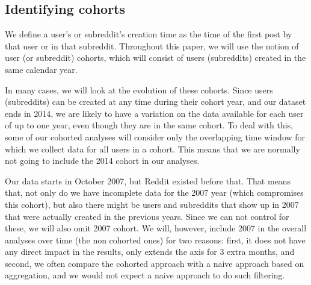 \subsection{Identifying cohorts}

We define a user's or subreddit's creation time as the time of the first post by that user or in that subreddit.  Throughout this paper, we will use the notion of user (or subreddit) cohorts, which will consist of users (subreddits) created in the same calendar year.

In many cases, we will look at the evolution of these cohorts. Since users (subreddits) can be created at any time during their cohort year, and our dataset ends in 2014, 
we are likely to have a variation on the data available for each user of up to one year, even though they are in the same cohort.  To deal with this, some of our cohorted analyses will consider only the overlapping time window for which we collect data for all users in a cohort.   This means that we are normally not going to include the 2014 cohort in our analyses.

Our data starts in October 2007, but Reddit existed before that. That means that, not only do we have incomplete data for the 2007 year (which compromises this cohort), but also there might be users and subreddits that show up in 2007 that were actually created in the previous years. Since we can not control for these, we will also omit 2007 cohort. We will, however, include 2007 in the overall analyses over time (the non cohorted ones) for two reasons: first, it does not have any direct impact in the results, only extends the axis for 3 extra months, and second, we often compare the cohorted approach with a naive approach based on aggregation, and we would not expect a naive approach to do such filtering. 
